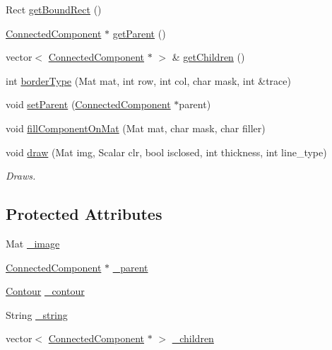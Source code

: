 \begin{DoxyCompactItemize}
Rect \hyperlink{class_connected_component_a7be353a1c50182b97b4f4e36d1bb5275}{get\+Bound\+Rect} ()
\item 
\hyperlink{class_connected_component}{Connected\+Component} $\ast$ \hyperlink{class_connected_component_a9ac344dd99b73e26ba9f12e632db9a81}{get\+Parent} ()
\item 
vector$<$ \hyperlink{class_connected_component}{Connected\+Component} $\ast$ $>$ \& \hyperlink{class_connected_component_a3d061e6cd4e5bf337b084a3463ea8bb0}{get\+Children} ()
\item 
int \hyperlink{class_connected_component_acca10d6015b6dbbf07fd111b07b5dee9}{border\+Type} (Mat mat, int row, int col, char mask, int \&trace)
\item 
void \hyperlink{class_connected_component_afbf7969c6c69fa5c603ca819d809c820}{set\+Parent} (\hyperlink{class_connected_component}{Connected\+Component} $\ast$parent)
\item 
void \hyperlink{class_connected_component_a9cbcbbd6f27b0d5981522da5aa63ddac}{fill\+Component\+On\+Mat} (Mat mat, char mask, char filler)
\item 
void \hyperlink{class_connected_component_acf50ca5ed3d677faaff0b160b1e2a136}{draw} (Mat img, Scalar clr, bool isclosed, int thickness, int line\+\_\+type)
\begin{DoxyCompactList}\small\item\em Draws. \end{DoxyCompactList}\end{DoxyCompactItemize}
\subsection*{Protected Attributes}
\begin{DoxyCompactItemize}
\item 
Mat \hyperlink{class_connected_component_aeffe49ad736a5be430f40ffe2816234b}{\+\_\+image}
\item 
\hyperlink{class_connected_component}{Connected\+Component} $\ast$ \hyperlink{class_connected_component_a802edcad018e25fbf4398d3c1eaad926}{\+\_\+parent}
\item 
\hyperlink{class_contour}{Contour} \hyperlink{class_connected_component_ac41ea811b504bd7b57ed2cfaf6a73e04}{\+\_\+contour}
\item 
String \hyperlink{class_connected_component_a3d7c59ca80f6304b1f07a0e196a45bc1}{\+\_\+string}
\item 
vector$<$ \hyperlink{class_connected_component}{Connected\+Component} $\ast$ $>$ \hyperlink{class_connected_component_a68dde04250c15d018d774d55b8dc521c}{\+\_\+children}
\end{DoxyCompactItemize}


